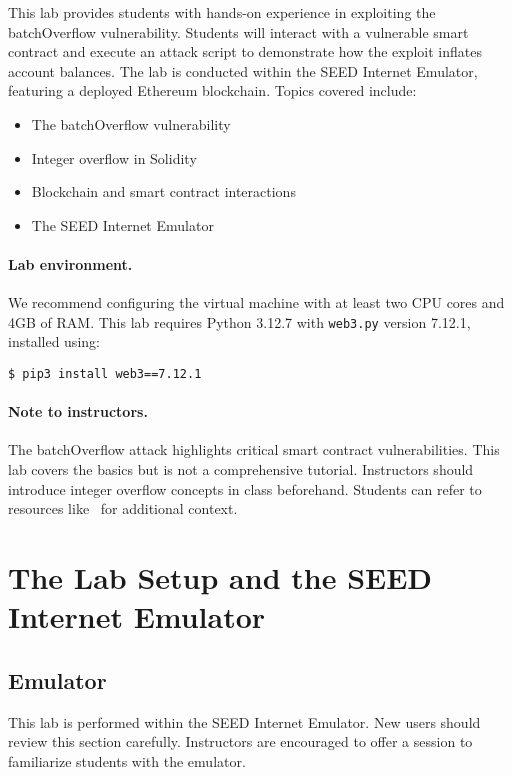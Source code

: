 This lab provides students with hands-on experience in exploiting the batchOverflow vulnerability. Students will interact with a vulnerable smart contract and execute an attack script to demonstrate how the exploit inflates account balances. The lab is conducted within the SEED Internet Emulator, featuring a deployed Ethereum blockchain. Topics covered include:

\begin{itemize}[noitemsep]
    \item The batchOverflow vulnerability
    \item Integer overflow in Solidity
    \item Blockchain and smart contract interactions
    \item The SEED Internet Emulator
\end{itemize}

\paragraph{Lab environment.}
\seedenvironmentB
\nodependency
We recommend configuring the virtual machine with at least two CPU cores and 4GB of RAM. This lab requires Python 3.12.7 with \texttt{web3.py} version 7.12.1, installed using:

\begin{lstlisting}
$ pip3 install web3==7.12.1
\end{lstlisting}

\paragraph{Note to instructors.}
The batchOverflow attack highlights critical smart contract vulnerabilities. This lab covers the basics but is not a comprehensive tutorial. Instructors should introduce integer overflow concepts in class beforehand. Students can refer to resources like~\cite{PeckShield2018} for additional context.

\section{The Lab Setup and the SEED Internet Emulator}
\label{sec:labsetup}

\subsection{Emulator}

This lab is performed within the SEED Internet Emulator. New users should review this section carefully. Instructors are encouraged to offer a session to familiarize students with the emulator.


